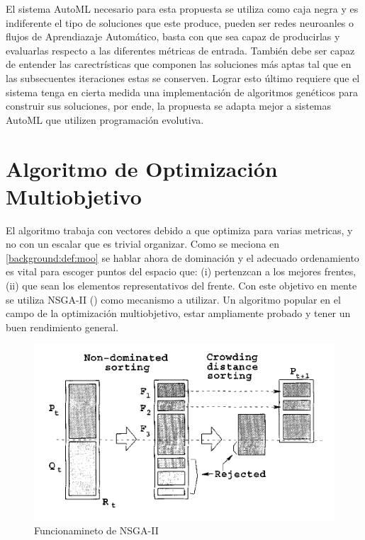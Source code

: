 El sistema AutoML necesario para esta propuesta se utiliza como caja negra y  es indiferente el tipo de soluciones que este produce, pueden ser redes neuroanles o flujos de Aprendiazaje Autom\'atico, basta con que sea capaz de producirlas y evaluarlas respecto a las diferentes m\'etricas de entrada.
Tambi\'en debe ser capaz de entender las carectr\'isticas que componen las soluciones m\'as aptas tal que en las subsecuentes iteraciones estas se conserven. Lograr esto \'ultimo requiere que el sistema tenga en cierta medida una implementaci\'on de algoritmos gen\'eticos para construir sus soluciones, por ende, la propuesta se adapta mejor a sistemas AutoML que utilizen programaci\'on evolutiva.

\section{Algoritmo de Optimizaci\'on Multiobjetivo}

El algoritmo trabaja con vectores debido a que optimiza para varias metricas, y no con un escalar que es trivial organizar. Como se meciona en \ref{background:def:moo} se hablar ahora de dominaci\'on y el adecuado ordenamiento es vital para escoger puntos del espacio que: (i) pertenzcan a los mejores frentes, (ii) que sean los elementos representativos del frente. Con este objetivo en mente se utiliza NSGA-II (\cite{deb2002fast}) como mecanismo a utilizar. Un algoritmo popular en el campo de la optimizaci\'on multiobjetivo, estar ampliamente probado y tener un buen rendimiento general. 

\begin{figure}[ht]\caption{Funcionamineto de NSGA-II}\label{proposal:fig:nsga2}
    \centering
    \includegraphics[scale=0.5]{Pictures/nsga2.png}
\end{figure}

